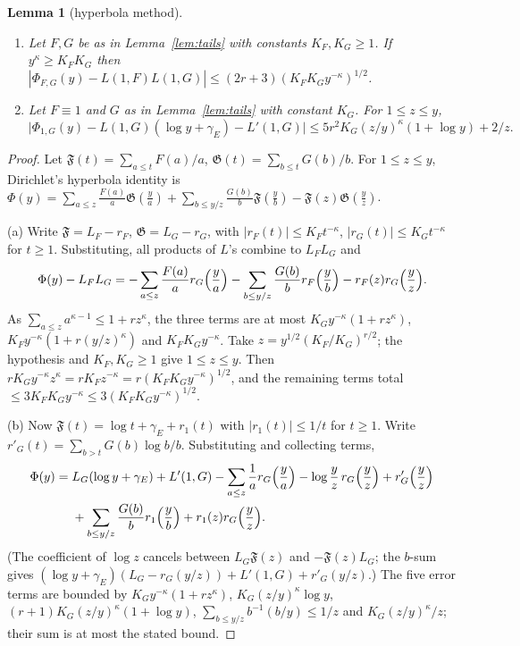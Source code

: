 \documentclass[11pt,reqno]{amsart}
\newtheorem{lemma}[theorem]{Lemma}
\theoremstyle{definition}
\begin{document}
\begin{lemma}[hyperbola method]\label{lem:hyperbola}
\begin{enumerate}
\item[(a)] Let $F,G$ be as in Lemma~\ref{lem:tails} with constants
$K_F,K_G\ge1$.  If $y^\kappa\ge K_FK_G$ then
$|\Phi_{F,G}(y)-L(1,F)L(1,G)|\le(2r+3)(K_FK_Gy^{-\kappa})^{1/2}$.
\item[(b)] Let $F\equiv1$ and $G$ as in Lemma~\ref{lem:tails} with
constant $K_G$.  For $1\le z\le y$,
\[
 \bigl|\Phi_{1,G}(y)-L(1,G)(\log y+\gamma_E)-L'(1,G)\bigr|\le
 5r^2K_G(z/y)^\kappa(1+\log y)+2/z .
\]
\end{enumerate}
\end{lemma}
\begin{proof}
Let $\mathfrak F(t)=\sum_{a\le t}F(a)/a$, $\mathfrak G(t)=\sum_{b\le
t}G(b)/b$.  For $1\le z\le y$, Dirichlet's hyperbola identity is
$\Phi(y)=\sum_{a\le z}\frac{F(a)}a\mathfrak G(\frac ya)+\sum_{b\le
y/z}\frac{G(b)}b\mathfrak F(\frac yb)-\mathfrak F(z)\mathfrak G(\frac yz)$.

(a) Write $\mathfrak F=L_F-r_F$, $\mathfrak G=L_G-r_G$, with
$|r_F(t)|\le K_Ft^{-\kappa}$, $|r_G(t)|\le K_Gt^{-\kappa}$ for $t\ge1$.
Substituting, all products of $L$'s combine to $L_FL_G$ and
\[
 \Phi(y)-L_FL_G=-\sum_{a\le z}\frac{F(a)}ar_G\Bigl(\frac ya\Bigr)
 -\sum_{b\le y/z}\frac{G(b)}br_F\Bigl(\frac yb\Bigr)-r_F(z)r_G\Bigl(\frac yz\Bigr).
\]
As $\sum_{a\le z}a^{\kappa-1}\le1+rz^\kappa$, the three terms are at most
$K_Gy^{-\kappa}(1+rz^\kappa)$, $K_Fy^{-\kappa}(1+r(y/z)^\kappa)$ and
$K_FK_Gy^{-\kappa}$.  Take $z=y^{1/2}(K_F/K_G)^{r/2}$; the hypothesis and
$K_F,K_G\ge1$ give $1\le z\le y$.  Then
$rK_Gy^{-\kappa}z^\kappa=rK_Fz^{-\kappa}=r(K_FK_Gy^{-\kappa})^{1/2}$, and the
remaining terms total $\le3K_FK_Gy^{-\kappa}\le3(K_FK_Gy^{-\kappa})^{1/2}$.

(b) Now $\mathfrak F(t)=\log t+\gamma_E+r_1(t)$ with $|r_1(t)|\le1/t$ for
$t\ge1$.  Write $r'_G(t)=\sum_{b>t}G(b)\log b/b$.  Substituting and
collecting terms,
\begin{align*}
\Phi(y)={}&L_G(\log y+\gamma_E)+L'(1,G)
-\sum_{a\le z}\frac1ar_G\Bigl(\frac ya\Bigr)-\log\frac yz\,r_G\Bigl(\frac yz\Bigr)
+r'_G\Bigl(\frac yz\Bigr)\\
&+\sum_{b\le y/z}\frac{G(b)}br_1\Bigl(\frac yb\Bigr)+r_1(z)r_G\Bigl(\frac yz\Bigr).
\end{align*}
(The coefficient of $\log z$ cancels between $L_G\mathfrak F(z)$ and
$-\mathfrak F(z)L_G$; the $b$-sum gives $(\log y+\gamma_E)(L_G-r_G(y/z))
+L'(1,G)+r'_G(y/z)$.)  The five error terms are bounded by
$K_Gy^{-\kappa}(1+rz^\kappa)$, $K_G(z/y)^\kappa\log y$,
$(r+1)K_G(z/y)^\kappa(1+\log y)$, $\sum_{b\le y/z}b^{-1}(b/y)\le1/z$ and
$K_G(z/y)^\kappa/z$; their sum is at most the stated bound.
\end{proof}
\end{document}
